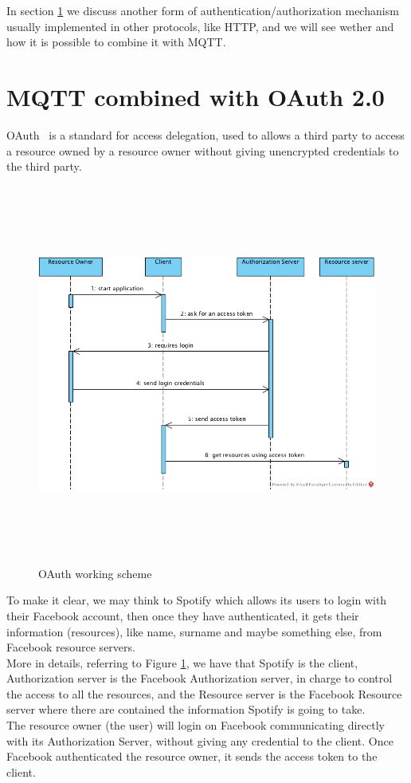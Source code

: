 \documentclass[12pt]{report}
\begin{document}
{{In section \ref{sec:mqttauth2} we discuss another form of authentication/authorization mechanism usually implemented in other protocols, like HTTP, and we will see wether and how it is possible to combine it with MQTT. 

\section{MQTT combined with OAuth 2.0}
\label{sec:mqttauth2}
\bigskip
OAuth~\cite{oauthwiki} is a standard for access delegation, used to allows a third party to access a resource owned by a resource owner without giving unencrypted credentials to the third party.

\begin{figure}[H]
\includegraphics[width=12.5cm,height=12.5cm,keepaspectratio]{oauth_scheme}
\centering
\caption{OAuth working scheme}
\label{fig:oauthscheme}
\end{figure}

To make it clear, we may think to Spotify which allows its users to login with their Facebook account, then once they have authenticated, it gets their information (resources), like name, surname and maybe something else, from Facebook resource servers.\\
More in details, referring to Figure \ref{fig:oauthscheme}, we have that Spotify is the client, Authorization server is the Facebook Authorization server, in charge to control the access to all the resources, and the Resource server is the Facebook Resource server where there are contained the information Spotify is going to take.\\
The resource owner (the user) will login on Facebook communicating directly with its Authorization Server, without giving any credential to the client. Once Facebook authenticated the resource owner, it sends the access token to the client.

}}
\end{document}
